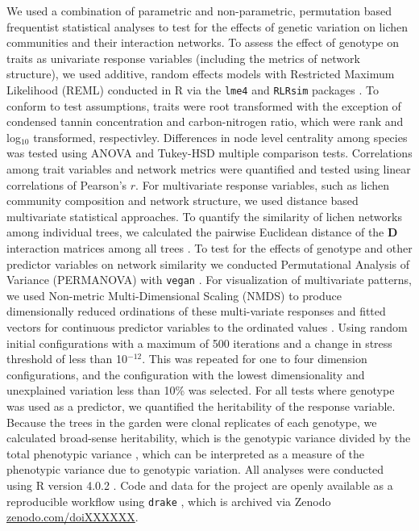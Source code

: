 \documentclass[fleqn,12pt]{olplainarticle}
\begin{document}
We used a combination of parametric and non-parametric, permutation
based frequentist statistical analyses to test for the effects of
genetic variation on lichen communities and their interaction
networks. To assess the effect of genotype on traits as univariate
response variables (including the metrics of network structure), we
used additive, random effects models with Restricted Maximum
Likelihood (REML) conducted in R via the \texttt{lme4} and
\texttt{RLRsim} packages \citep{lme4, RLRsim}. To conform to test
assumptions, traits were root transformed with the exception of
condensed tannin concentration and carbon-nitrogen ratio, which were
rank and log$_{10}$ transformed, respectivley. Differences in node
level centrality among species was tested using ANOVA and Tukey-HSD
multiple comparison tests. Correlations among trait variables and
network metrics were quantified and tested using linear correlations
of Pearson's $r$. For multivariate response variables, such as lichen
community composition and network structure, we used distance based
multivariate statistical approaches. To quantify the similarity of
lichen networks among individual trees, we calculated the pairwise
Euclidean distance of the $\mathbf{D}$ interaction matrices among all
trees \citep{Newman2010}. To test for the effects of genotype and
other predictor variables on network similarity we conducted
Permutational Analysis of Variance (PERMANOVA) with \texttt{vegan}
\citep{vegan}. For visualization of multivariate patterns, we used
Non-metric Multi-Dimensional Scaling (NMDS) \citep{ecodist} to produce
dimensionally reduced ordinations of these multi-variate responses and
fitted vectors for continuous predictor variables to the ordinated
values \citep{vegan}. Using random initial configurations with a
maximum of 500 iterations and a change in stress threshold of less
than 10$^{-12}$. This was repeated for one to four dimension
configurations, and the configuration with the lowest dimensionality
and unexplained variation less than 10\% was selected. For all tests
where genotype was used as a predictor, we quantified the heritability
of the response variable. Because the trees in the garden were clonal
replicates of each genotype, we calculated broad-sense heritability,
which is the genotypic variance divided by the total phenotypic
variance \citep{Conner2004ATextbook}, which can be interpreted as a
measure of the phenotypic variance due to genotypic variation. All
analyses were conducted using R version 4.0.2 \citep{R2020}. Code and
data for the project are openly available as a reproducible workflow
using \texttt{drake} \citep{drake}, which is archived via Zenodo
\url{zenodo.com/doiXXXXXX}.
\end{document}
